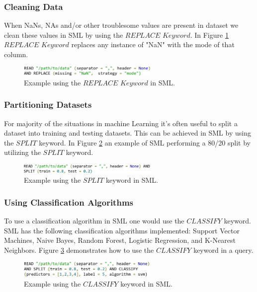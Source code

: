 \documentclass[jair,twoside,11pt,theapa]{article}
\begin{document}
\subsubsection{Cleaning Data}
When NaNs, NAs and/or other troublesome values are present in dataset we clean these values in SML by using the \(REPLACE\) \(Keyword\). In Figure \ref{fig:SML:REPLACE} \(REPLACE\) \(Keyword\) replaces any instance of "NaN" with the mode of that column.  

\begin{figure}
\includegraphics[width=0.6\textwidth]{figs/REPLACE.png}
\centering
\caption{Example using the \(REPLACE\) \(Keyword\) in SML.}
\label{fig:SML:REPLACE}
\end{figure}

\subsubsection{Partitioning Datasets}
For majority of the situations in machine Learning it's often useful to split a dataset into training and testing datasets. This can be achieved in SML by using the \(SPLIT\) keyword. In Figure \ref{fig:SML:SPLIT} an example of SML performing a 80/20 split by utilizing the \(SPLIT\) keyword.

\begin{figure}
\includegraphics[width=0.6\textwidth]{figs/SPLIT.png}
\centering
\caption{Example using the \(SPLIT\) keyword in SML.}
\label{fig:SML:SPLIT}
\end{figure}

\subsubsection{Using Classification Algorithms}
To use a classification algorithm in SML one would use the \(CLASSIFY\) keyword. SML has the following classification algorithms implemented: Support Vector Machines, Naive Bayes, Random Forest, Logistic Regression, and K-Nearest Neighbors. Figure \ref{fig:SML:CLASSIFY} demonstrates how to use the \(CLASSIFY\) keyword in a query.

\begin{figure}
\includegraphics[width=0.6\textwidth]{figs/CLASSIFY.png}
\centering
\caption{Example using the \(CLASSIFY\) keyword in SML.}
\label{fig:SML:CLASSIFY}
\end{figure}
\end{document}
